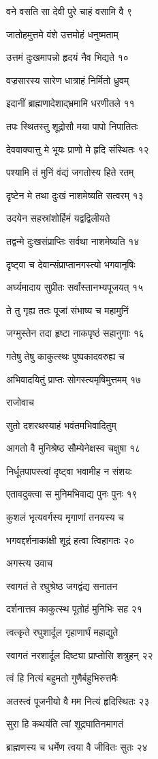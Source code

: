 वने वसति सा देवी पुरे चाहं वसामि वै ९

जातोहमुत्तमे वंशे उत्तमोहं धनुष्मताम्

उत्तमं दुःखमापन्नो हृदयं नैव भिद्यते १०

वज्रसारस्य सारेण धात्राहं निर्मितो ध्रुवम्

इदानीं ब्राह्मणादेशाद्भ्रमामि धरणीतले ११

तपः स्थितस्तु शूद्रोसौ मया पापो निपातितः

देववाक्यात्तु मे भूयः प्राणो मे हृदि संस्थितः १२

पश्यामि तं मुनिं वंद्यं जगतोस्य हिते रतम्

दृष्टेन मे तथा दुःखं नाशमेष्यति सत्वरम् १३

उदयेन सहस्रांशोर्हिमं यद्वद्विलीयते

तद्वन्मे दुःखसंप्राप्तिः सर्वथा नाशमेष्यति १४

दृष्ट्वा च देवान्संप्राप्तानगस्त्यो भगवानृषिः

अर्घ्यमादाय सुप्रीतः सर्वांस्तानभ्यपूजयत् १५

ते तु गृह्य ततः पूजां संभाष्य च महामुनिं

जग्मुस्तेन तदा हृष्टा नाकपृष्ठं सहानुगाः १६

गतेषु तेषु काकुत्स्थः पुष्पकादवरुह्य च

अभिवादयितुं प्राप्तः सोगस्त्यमृषिमुत्तमम् १७

राजोवाच

सुतो दशरथस्याहं भवंतमभिवादितुम्

आगतो वै मुनिश्रेष्ठ सौम्येनेक्षस्व चक्षुषा १८

निर्धूतपापस्त्वां दृष्ट्वा भवामीह न संशयः

एतावदुक्त्वा स मुनिमभिवाद्य पुनः पुनः १९

कुशलं भृत्यवर्गस्य मृगाणां तनयस्य च

भगवद्दर्शनाकांक्षी शूद्रं हत्वा त्विहागतः २०

अगस्त्य उवाच

स्वागतं ते रघुश्रेष्ठ जगद्वंद्य सनातन

दर्शनात्तव काकुत्स्थ पूतोहं मुनिभिः सह २१

त्वत्कृते रघुशार्दूल गृहाणार्घं महाद्युते

स्वागतं नरशार्दूल दिष्ट्या प्राप्तोसि शत्रुहन् २२

त्वं हि नित्यं बहुमतो गुणैर्बहुभिरुत्तमैः

अतस्त्वं पूजनीयो वै मम नित्यं हृदिस्थितः २३

सुरा हि कथयंति त्वां शूद्रघातिनमागतं

ब्राह्मणस्य च धर्मेण त्वया वै जीवितः सुतः २४

